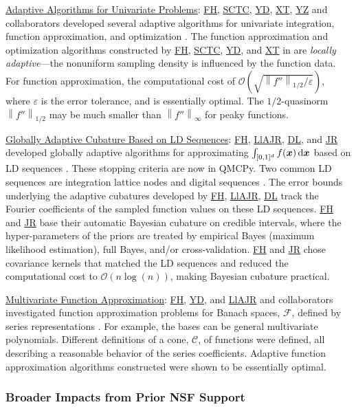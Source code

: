 \documentclass[11pt]{NSFamsart}
\newcommand{\Upara}[1]{\noindent\underline{#1}:\xspace}
\newcommand{\FH}{\hyperlink{FHlink}{FH}\xspace}
\newcommand{\SCTC}{\hyperlink{SCTClink}{SCTC}\xspace}
\newcommand{\YD}{\hyperlink{YDlink}{YD}\xspace}
\newcommand{\JR}{\hyperlink{JRlink}{JR}\xspace}
\newcommand{\LlAJR}{\hyperlink{LlAJRlink}{LlAJR}\xspace}
\newcommand{\XT}{\hyperlink{XTlink}{XT}\xspace}
\newcommand{\DL}{\hyperlink{DLlink}{DL}\xspace}
\newcommand{\YZ}{\hyperlink{YZlink}{YZ}\xspace}
\newcommand{\bx}{{\boldsymbol{x}}}
\def\dif{\textup{d}}
\newcommand{\calc}{{\mathcal{C}}}
\newcommand{\calf}{{\mathcal{F}}}
\newcommand{\norm}[2][{}]{\ensuremath{\left \lVert #2 \right \rVert}_{#1}}
\newcommand{\Order}{\mathcal{O}}
\begin{document}
\Upara{Adaptive Algorithms for Univariate Problems}
\FH, \SCTC, \YD, \XT, \YZ and collaborators developed several adaptive algorithms for univariate integration, function approximation, and optimization \cite{ChoEtal17a,HicEtal14b,  Din15a, Ton14a, Zha18a}.  The function approximation and optimization algorithms constructed by \FH, \SCTC, \YD, and \XT in \cite{ChoEtal17a} are \emph{locally adaptive}---the nonuniform sampling density is influenced by the function data.  For function approximation, the computational cost of $\Order\left(\sqrt{\norm[1/2]{f''}/\varepsilon} \right)$, where $\varepsilon$ is the error tolerance, and is essentially optimal.  The $1/2$-quasinorm $\norm[1/2]{f''}$ may be much smaller than
$\norm[\infty]{f''}$ for peaky functions.


\Upara{Globally Adaptive Cubature Based on LD Sequences}
\FH, \LlAJR, \DL, and \JR developed globally adaptive algorithms for approximating $\int_{[0,1]^d} f(\bx) \, \dif \bx$ based on LD sequences \cite{HicJim16a,HicEtal17a,JimHic16a}.  These stopping criteria are now in QMCPy. Two common LD sequences are integration lattice nodes and digital sequences \cite{DicEtal14a}.  The error bounds underlying the adaptive cubatures developed by \FH, \LlAJR, \DL track the  Fourier coefficients of the sampled function values on these LD sequences.  \FH and \JR base their automatic Bayesian cubature on credible intervals, where the hyper-parameters of the priors are treated by empirical Bayes (maximum likelihood estimation), full Bayes, and/or cross-validation.   \FH and \JR chose covariance kernels that matched the LD sequences and reduced the computational cost to $\Order(n \log(n))$, making Bayesian cubature practical.

\Upara{Multivariate Function Approximation}
\FH, \YD, and \LlAJR and collaborators investigated function approximation problems for Banach spaces, $\calf$, defined by series representations \cite{DinHic20a,DinEtal20a}.  For example, the bases can be general multivariate polynomials.  Different definitions of a cone, $\calc$, of functions were defined, all describing a reasonable behavior of the series coefficients.  Adaptive function approximation algorithms constructed were shown to be essentially optimal.


\subsubsection{Broader Impacts from Prior NSF Support} \label{prevBIsect}
\phantom{a}
\end{document}
